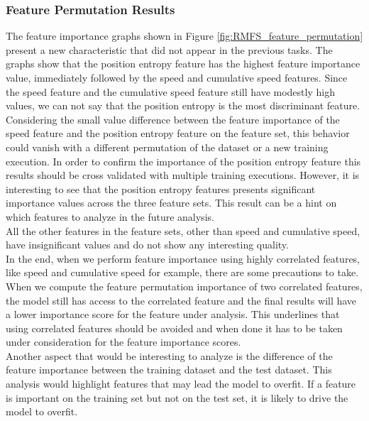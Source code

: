 \documentclass[../../Thesis.tex]{subfiles}
\begin{document}
			\subsubsection{Feature Permutation Results}
				The feature importance graphs shown in Figure \ref{fig:RMFS_feature_permutation} present a new characteristic that did not appear in the previous tasks. The graphs show that the position entropy feature has the highest feature importance value, immediately followed by the speed and cumulative speed features. Since the speed feature and the cumulative speed feature still have modestly high values, we can not say that the position entropy is the most discriminant feature. Considering the small value difference between the feature importance of the speed feature and the position entropy feature on the feature set, this behavior could vanish with a different permutation of the dataset or a new training execution. In order to confirm the importance of the position entropy feature this results should be cross validated with multiple training executions. However, it is interesting to see that the position entropy features presents significant importance values across the three feature sets. This result can be a hint on which features to analyze in the future analysis.\\
				All the other features in the feature sets, other than speed and cumulative speed, have insignificant values and do not show any interesting quality.\\
				In the end, when we perform feature importance using highly correlated features, like speed and cumulative speed for example,  there are some precautions to take. When we compute the feature permutation importance of two correlated features, the model still has access to the correlated feature and the final results will have a lower importance score for the feature under analysis. This underlines that using correlated features should be avoided and when done it has to be taken under consideration for the feature importance scores. \\
				Another aspect that would be interesting to analyze is the difference of the feature importance between the training dataset and the test dataset. This analysis would highlight features that may lead the model to overfit. If a feature is important on the training set but not on the test set, it is likely to drive the model to overfit.
\end{document}
